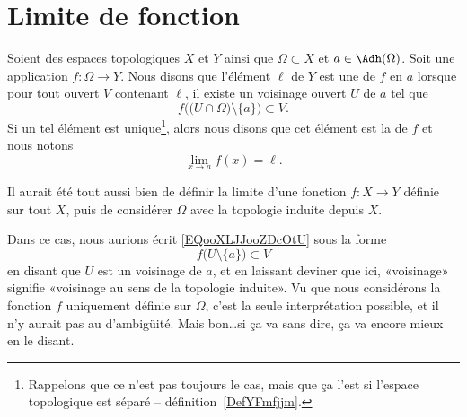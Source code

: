 \section{Limite de fonction}

\begin{definition}\label{DefYNVoWBx}
	Soient des espaces topologiques \( X\) et \( Y\) ainsi que \( \Omega\subset X\) et \( a\in \Adh(\Omega)\). Soit une application \( f\colon \Omega\to Y\). Nous disons que l'élément \( \ell\) de \( Y\) est une  de \( f\) en \( a\) lorsque pour tout ouvert \( V\) contenant \( \ell\), il existe un voisinage ouvert \( U\) de \( a\) tel que
	\begin{equation}        \label{EQooXLJJooZDcOtU}
		f\Big( \big( U\cap\Omega\big)\setminus\{ a \} \Big)\subset V.
	\end{equation}
	Si un tel élément est unique\footnote{Rappelons que ce n'est pas toujours le cas, mais que ça l'est si l'espace topologique est séparé -- définition~\ref{DefYFmfjjm}.}, alors nous disons que cet élément est la  de \( f\) et nous notons
	\begin{equation}
		\lim_{x\to a} f(x)=\ell.
	\end{equation}
\end{definition}

\begin{normaltext}
	Il aurait été tout aussi bien de définir la limite d'une fonction \( f\colon X\to Y\) définie sur tout \( X\), puis de considérer \( \Omega\) avec la topologie induite depuis \( X\).

	Dans ce cas, nous aurions écrit \eqref{EQooXLJJooZDcOtU} sous la forme
	\begin{equation}
		f\Big(  U\setminus\{ a \} \Big)\subset V
	\end{equation}
	en disant que \( U\) est un voisinage de \( a\), et en laissant  deviner que ici, «voisinage» signifie «voisinage au sens de la topologie induite». Vu que nous considérons la fonction \( f\) uniquement définie sur \( \Omega\), c'est la seule interprétation possible, et il n'y aurait pas au d'ambigüité\cite{BIBooMDAKooGEtFUd}. Mais bon\ldots si ça va sans dire, ça va encore mieux en le disant.
\end{normaltext}

